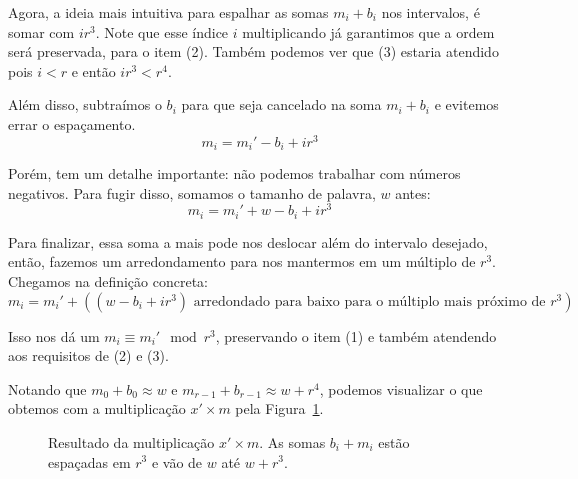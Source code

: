 Agora, a ideia mais intuitiva para espalhar as somas $m_i+b_i$ nos intervalos, é
somar com $ir^3$. Note que esse índice $i$ multiplicando já garantimos que a
ordem será preservada, para o item (2). Também podemos ver que (3) estaria
atendido pois $i<r$ e então $ir^3<r^4$.

Além disso, subtraímos o $b_i$ para que seja cancelado na soma $m_i+b_i$ e
evitemos errar o espaçamento.
\[
m_i = m_i' - b_i + ir^3
\]

Porém, tem um detalhe importante: não podemos trabalhar com números negativos.
Para fugir disso, somamos o tamanho de palavra, $w$ antes:
\[
m_i = m_i'+ w  - b_i + ir^3 
\]

Para finalizar, essa soma a mais pode nos deslocar além do intervalo desejado,
então, fazemos um arredondamento para nos mantermos em um múltiplo de $r^3$.
Chegamos na definição concreta:
\[
m_i=m_i'+((w-b_i+ir^3) \text{ arredondado para baixo para o múltiplo mais próximo de } r^3)
\]

Isso nos dá um $m_i\equiv m_i' \mod r^3$, preservando o item (1) e também
atendendo aos requisitos de (2) e (3).

Notando que $m_0+b_0\approx w$ e $m_{r-1}+b_{r-1}\approx w+r^4$, podemos
visualizar o que obtemos com a multiplicação $x'\times m$ pela
Figura~\ref{f:fusion-approx-sketch}.

\begin{figure}[htbp]
\centering
{}
\caption{Resultado da multiplicação $x'\times m$. As somas $b_i+m_i$ estão
espaçadas em $r^3$ e vão de $w$ até $w+r^3$.\label{f:fusion-approx-sketch}}
\end{figure}

